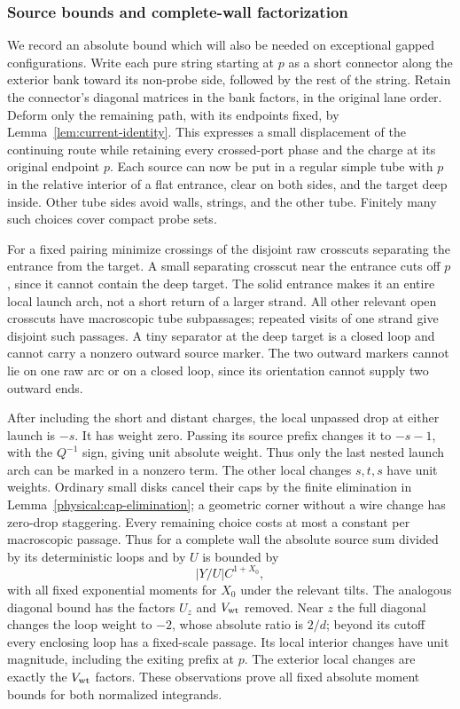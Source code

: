 \subsubsection{Source bounds and complete-wall factorization}
We record an absolute bound which will also be needed on exceptional
gapped configurations.  Write each pure string starting at $p$ as a
short connector along the exterior bank toward its non-probe side,
followed by the rest of the string.  Retain the connector's diagonal
matrices in the bank factors, in the original lane order.  Deform only
the remaining path, with its endpoints fixed, by
Lemma~\ref{lem:current-identity}.  This expresses a small displacement
of the continuing route while retaining every crossed-port phase and
the charge at its original endpoint $p$.
Each source can now be put in a regular simple tube with $p$ in
the relative interior of a flat entrance, clear on both sides,
and the target deep inside.  Other tube sides avoid walls,
strings, and the other tube.  Finitely many such choices cover
compact probe sets.

For a fixed pairing minimize crossings of the disjoint raw crosscuts
separating the entrance from the target.  A small separating crosscut
near the entrance cuts off $p$, since it cannot contain the deep
target.  The solid entrance makes it an entire local launch arch,
not a short return of a larger strand.  All other relevant open
crosscuts have macroscopic tube subpassages; repeated visits of one
strand give disjoint such passages.  A tiny separator at the deep
target is a closed loop and cannot carry a nonzero outward source
marker.  The two outward markers cannot lie on one raw arc or on a
closed loop, since its orientation cannot supply two outward ends.

After including the short and distant charges, the local unpassed
drop at either launch is $-s$.  It has weight zero.  Passing its
source prefix changes it to $-s-1$, with the $Q^{-1}$ sign, giving
unit absolute weight.  Thus only the last nested launch arch can
be marked in a nonzero term.  The other local changes $s,t,s$ have
unit weights.  Ordinary small disks cancel their caps by the
finite elimination in Lemma~\ref{physical:cap-elimination}; a
geometric corner without a wire change has zero-drop staggering.
Every remaining choice costs at most a constant per macroscopic
passage.  Thus for a complete wall the absolute source sum divided
by its deterministic loops and by $U$ is bounded by
\begin{equation}
 |Y/U|C^{1+X_0},
 \label{obs:absolute-source-bound}
\end{equation}
with all fixed exponential moments for $X_0$ under the relevant
tilts.  The analogous diagonal bound has the factors $U_z$ and
$V_{\rm wt}$ removed.  Near $z$ the full diagonal changes the loop
weight to $-2$, whose absolute ratio is $2/d$; beyond its cutoff
every enclosing loop has a fixed-scale passage.  Its local
interior changes have unit magnitude, including the exiting
prefix at $p$.  The exterior local changes are exactly the
$V_{\rm wt}$ factors.  These observations prove all fixed
absolute moment bounds for both normalized integrands.


